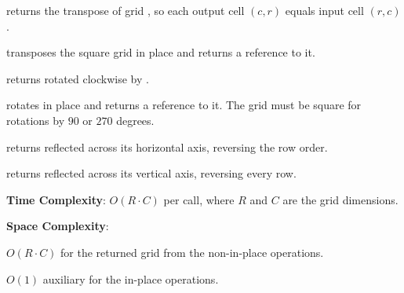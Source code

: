 \begin{compactitem}
  \item {} returns the transpose of grid , so each output cell $(c, r)$ equals input cell $(r, c)$.
  \item {} transposes the square grid  in place and returns a reference to it.
  \item {} returns  rotated clockwise by .
  \item {} rotates  in place and returns a reference to it. The grid must be square for rotations by $90$ or $270$ degrees.
  \item {} returns  reflected across its horizontal axis, reversing the row order.
  \item {} returns  reflected across its vertical axis, reversing every row.
\end{compactitem}

\textbf{Time Complexity}: $O(R \cdot C)$ per call, where $R$ and $C$ are the grid dimensions.

\textbf{Space Complexity}:
\begin{compactitem}
  \item $O(R \cdot C)$ for the returned grid from the non-in-place operations.
  \item $O(1)$ auxiliary for the in-place operations.
\end{compactitem}

